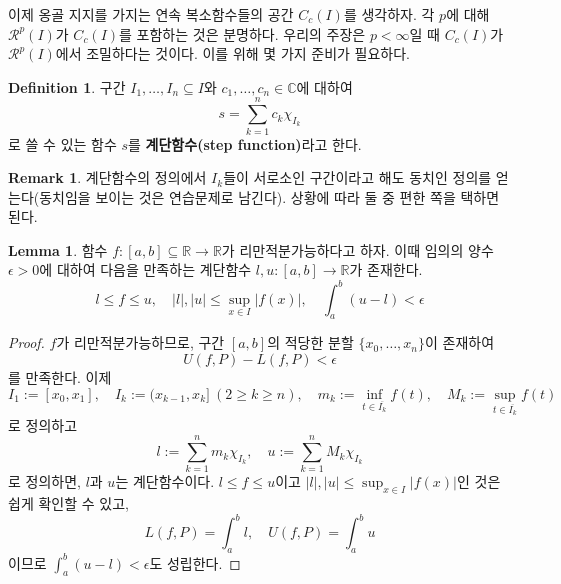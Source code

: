 \documentclass[11pt]{book}
\numberwithin{equation}{chapter}
\def\RR{\mathbb{R}}
\def\CC{\mathbb{C}}
\def\eps{\epsilon}
\def\calR{\mathcal{R}}
\newcommand{\abs}[1]{\left\vert#1\right\vert}
\theoremstyle{definition}
\newtheorem{lem}[thm]{Lemma}
\newtheorem{defn}[thm]{Definition}
\newtheorem*{rem}{Remark}
\begin{document}
이제 옹골 지지를 가지는 연속 복소함수들의 공간 \(C_c(I)\)를 생각하자. 각 \(p\)에 대해 \(\calR^p(I)\)가 \(C_c(I)\)를 포함하는 것은 분명하다. 우리의 주장은 \(p < \infty\)일 때 \(C_c(I)\)가 \(\calR^p(I)\)에서 조밀하다는 것이다. 이를 위해 몇 가지 준비가 필요하다.

\begin{defn}
    구간 \(I_1, \ldots, I_n \subseteq I\)와 \(c_1, \ldots, c_n \in \CC\)에 대하여
    \[
    s = \sum_{k=1}^n c_k \chi_{I_k}
    \]
    로 쓸 수 있는 함수 \(s\)를 \textbf{계단함수(step function)}라고 한다.
\end{defn}

\begin{rem}
    계단함수의 정의에서 \(I_k\)들이 서로소인 구간이라고 해도 동치인 정의를 얻는다(동치임을 보이는 것은 연습문제로 남긴다). 상황에 따라 둘 중 편한 쪽을 택하면 된다.
\end{rem}

\begin{lem} \label{13.1.14}
    함수 \(f : [a, b] \subseteq \RR \to \RR\)가 리만적분가능하다고 하자. 이때 임의의 양수 \(\eps > 0\)에 대하여 다음을 만족하는 계단함수 \(l, u : [a, b] \to \RR\)가 존재한다.
    \[
        l \le f \le u, \quad \abs{l}, \abs{u} \le \sup_{x \in I} \abs{f(x)}, \quad \int_a^b (u - l) < \eps      
    \]
\end{lem}
\begin{proof}
    \(f\)가 리만적분가능하므로, 구간 \([a, b]\)의 적당한 분할 \(\{x_0, \ldots, x_n\}\)이 존재하여
    \[
    U(f, P) - L(f, P) < \eps    
    \]
    를 만족한다. 이제
    \[
    I_1 := [x_0, x_1], \quad I_k := (x_{k-1}, x_k] \ (2 \ge k \ge n), \quad m_k := \inf_{t \in \overline{I_k}} f(t), \quad M_k := \sup_{t \in \overline{I_k}} f(t)
    \]
    로 정의하고
    \[
    l := \sum_{k=1}^n m_k \chi_{I_k}, \quad u := \sum_{k=1}^n M_k \chi_{I_k}    
    \]
    로 정의하면, \(l\)과 \(u\)는 계단함수이다. \(l \le f \le u\)이고 \(\abs{l}, \abs{u} \le \sup_{x \in I} \abs{f(x)}\)인 것은 쉽게 확인할 수 있고,
    \[
    L(f, P) = \int_a^b l, \quad U(f, P) = \int_a^b u
    \]
    이므로 \(\int_a^b (u - l) < \eps\)도 성립한다.
\end{proof}
\end{document}
